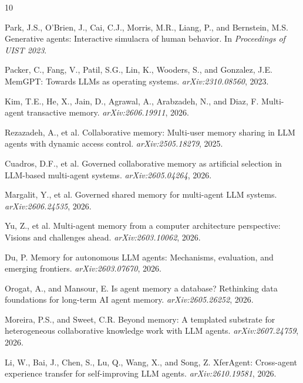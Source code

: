 \documentclass[11pt]{article}
\begin{document}
\begin{thebibliography}{10}

Park, J.S., O'Brien, J., Cai, C.J., Morris, M.R., Liang, P., and Bernstein, M.S.
\newblock Generative agents: Interactive simulacra of human behavior.
\newblock In \emph{Proceedings of UIST 2023}.

Packer, C., Fang, V., Patil, S.G., Lin, K., Wooders, S., and Gonzalez, J.E.
\newblock MemGPT: Towards LLMs as operating systems.
\newblock \emph{arXiv:2310.08560}, 2023.

Kim, T.E., He, X., Jain, D., Agrawal, A., Arabzadeh, N., and Diaz, F.
\newblock Multi-agent transactive memory.
\newblock \emph{arXiv:2606.19911}, 2026.

Rezazadeh, A., et al.
\newblock Collaborative memory: Multi-user memory sharing in LLM agents with dynamic access control.
\newblock \emph{arXiv:2505.18279}, 2025.

Cuadros, D.F., et al.
\newblock Governed collaborative memory as artificial selection in LLM-based multi-agent systems.
\newblock \emph{arXiv:2605.04264}, 2026.

Margalit, Y., et al.
\newblock Governed shared memory for multi-agent LLM systems.
\newblock \emph{arXiv:2606.24535}, 2026.

Yu, Z., et al.
\newblock Multi-agent memory from a computer architecture perspective: Visions and challenges ahead.
\newblock \emph{arXiv:2603.10062}, 2026.

Du, P.
\newblock Memory for autonomous LLM agents: Mechanisms, evaluation, and emerging frontiers.
\newblock \emph{arXiv:2603.07670}, 2026.

Orogat, A., and Mansour, E.
\newblock Is agent memory a database? Rethinking data foundations for long-term AI agent memory.
\newblock \emph{arXiv:2605.26252}, 2026.

Moreira, P.S., and Sweet, C.R.
\newblock Beyond memory: A templated substrate for heterogeneous collaborative knowledge work with LLM agents.
\newblock \emph{arXiv:2607.24759}, 2026.

Li, W., Bai, J., Chen, S., Lu, Q., Wang, X., and Song, Z.
\newblock XferAgent: Cross-agent experience transfer for self-improving LLM agents.
\newblock \emph{arXiv:2610.19581}, 2026.


\end{thebibliography}
\end{document}
